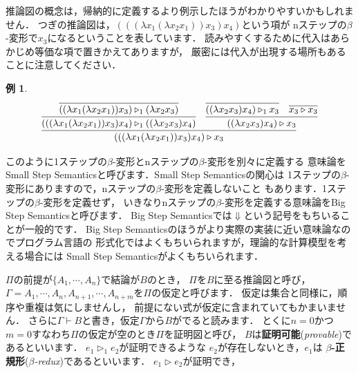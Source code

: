 \documentclass{ltjsbook}%
\newtheorem{example}{例}[section]%
\newcommand\term[2]{\textbf{#1}{(\textit{#2})}}%
\begin{document}
\par 推論図の概念は，帰納的に定義するより例示したほうがわかりやすいかもしれません．%
つぎの推論図は，$(((\lambda x_1(\lambda x_2 x_1))x_3)x_4)$という項が%
nステップの$\beta$-変形で$x_3$になるということを表しています．%
読みやすくするために代入はあらかじめ等価な項で置きかえてありますが，%
厳密には代入が出現する場所もあることに注意してください．%
\begin{example}%
  \begin{equation}%
    \infer{%
      (((\lambda x_1(\lambda x_2 x_1))x_3)x_4)\triangleright x_3%
    }{%
      \infer{%
        (((\lambda x_1(\lambda x_2 x_1))x_3)x_4)\triangleright_1%
        ((\lambda x_2 x_3)x_4)%
      }{%
        \infer{%
          ((\lambda x_1(\lambda x_2 x_1))x_3)\triangleright_1%
          (\lambda x_2 x_3)%
        }{%
        }%
      }%
    &%
      \infer{%
        ((\lambda x_2 x_3)x_4)\triangleright x_3%
      }{%
        \infer{%
          ((\lambda x_2 x_3)x_4)\triangleright_1x_3%
        }{%
        }%
      &%
        \infer{%
          x_3\triangleright x_3%
        }{%
        }%
      }%
    }%
  \end{equation}%
\end{example}%
\par このように1ステップの$\beta$-変形とnステップの$\beta$-変形を別々に定義する%
意味論をSmall Step Semanticsと呼びます．Small Step Semanticsの関心は%
1ステップの$\beta$-変形にありますので，nステップの$\beta$-変形を定義しないこと%
もあります．1ステップの$\beta$-変形を定義せず，%
いきなりnステップの$\beta$-変形を定義する意味論をBig Step Semanticsと呼びます．%
Big Step Semanticsでは$\Downarrow$という記号をもちいることが一般的です．%
Big Step Semanticsのほうがより実際の実装に近い意味論なのでプログラム言語の%
形式化ではよくもちいられますが，理論的な計算模型を考える場合には%
Small Step Semanticsがよくもちいられます．%
\par$\Pi$の前提が$\{A_1,\cdots,A_n\}$で結論が$B$のとき，%
$\Pi$を$B$に至る推論図と呼び，%
$\Gamma=A_1,\cdots,A_n,A_{n+1},\cdots,A_{n+m}$を$\Pi$の仮定と呼びます．%
仮定は集合と同様に，順序や重複は気にしませんし，%
前提にない式が仮定に含まれていてもかまいません．%
さらに$\Gamma\vdash B$と書き，仮定$\Gamma$から$B$がでると読みます．%
とくに$n=0$かつ$m=0$すなわち$\Pi$の仮定が空のとき$\Pi$を証明図と呼び，%
$B$は\term{証明可能}{provable}であるといいます．%
$\mathit{e}_1\triangleright_1\mathit{e}_2$が証明できるような%
$\mathit{e}_2$が存在しないとき，$\mathit{e}_1$は%
\term{$\beta$-正規形}{$\beta$-redux}であるといいます．%
$\mathit{e}_1\triangleright\mathit{e}_2$が証明でき，%
\end{document}
